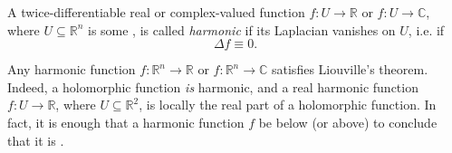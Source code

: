 \documentclass[12pt]{article}
\begin{document}
A twice-differentiable real or complex-valued function $f\colon U\to\mathbb{R}$ or $f\colon U\to\mathbb{C}$, where $U\subseteq\mathbb{R}^n$ is some , is called \emph{harmonic} if its Laplacian vanishes on $U$, i.e. if $$\Delta f\equiv 0.$$

Any harmonic function $f\colon\mathbb{R}^n\to\mathbb{R}$ or $f\colon\mathbb{R}^n\to\mathbb{C}$ satisfies Liouville's theorem.   Indeed, a holomorphic function \emph{is} harmonic, and a real harmonic function $f\colon U\to\mathbb{R}$, where $U\subseteq\mathbb{R}^2$, is locally the real part of a holomorphic function.  In fact, it is enough that a harmonic function $f$ be  below (or above) to conclude that it is .
\end{document}
